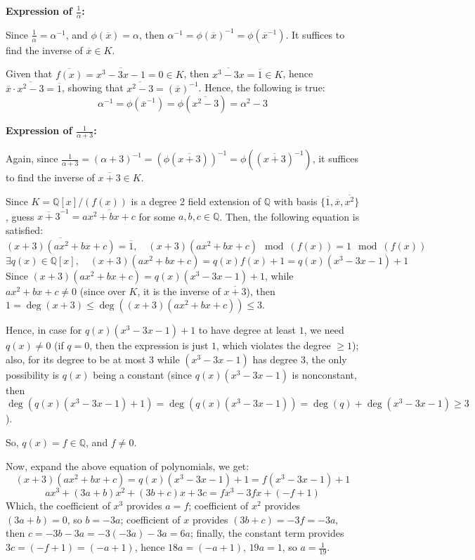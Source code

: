 \documentclass{article}
\begin{document}
\hfil

\textbf{Expression of $\frac{1}{\alpha}$:}

Since $\frac{1}{\alpha}=\alpha^{-1}$, and $\phi(\overline{x})=\alpha$, then $\alpha^{-1}=\phi(\overline{x})^{-1}=\phi(\overline{x}^{-1})$. It suffices to find the inverse of $\overline{x}\in K$.

Given that $\overline{f(x)}=\overline{x^3-3x-1}=0\in K$, then $\overline{x^3-3x}=\overline{1}\in K$, hence $\overline{x}\cdot\overline{x^2-3}=\overline{1}$, showing that $\overline{x^2-3}=(\overline{x})^{-1}$. 
Hence, the following is true:
$$\alpha^{-1}=\phi(\overline{x}^{-1})=\phi(\overline{x^2-3})=\alpha^2-3$$

\hfil

\textbf{Expression of $\frac{1}{\alpha+3}$:}

Again, since $\frac{1}{\alpha+3}=(\alpha+3)^{-1}=(\phi(\overline{x+3}))^{-1}=\phi((\overline{x+3})^{-1})$, it suffices to find the inverse of $\overline{x+3}\in K$.

Since $K=\mathbb{Q}[x]/(f(x))$ is a degree 2 field extension of $\mathbb{Q}$ with basis $\{\overline{1},\overline{x},\overline{x^2}\}$, guess $\overline{x+3}^{-1}=\overline{ax^2+bx+c}$ for some $a,b,c\in\mathbb{Q}$.
Then, the following equation is satisfied:
$$\overline{(x+3)(ax^2+bx+c)}=\overline{1},\quad (x+3)(ax^2+bx+c)\mod (f(x))=1\mod (f(x))$$
$$\exists q(x)\in\mathbb{Q}[x],\quad (x+3)(ax^2+bx+c) = q(x)f(x)+1 = q(x)(x^3-3x-1)+1$$ 
Since $(x+3)(ax^2+bx+c)=q(x)(x^3-3x-1)+1$, while $ax^2+bx+c\neq 0$ (since over $K$, it is the inverse of $\overline{x+3}$), then $1=\deg(x+3)\leq \deg((x+3)(ax^2+bx+c))\leq 3$.

Hence, in case for $q(x)(x^3-3x-1)+1$ to have degree at least $1$, we need $q(x)\neq 0$ (if $q=0$, then the expression is just $1$, which violates the degree $\geq 1$); 
also, for its degree to be at most $3$ while $(x^3-3x-1)$ has degree $3$, the only possibility is $q(x)$ being a constant (since $q(x)(x^3-3x-1)$ is nonconstant, then $\deg(q(x)(x^3-3x-1)+1)=\deg(q(x)(x^3-3x-1))=\deg(q)+ \deg(x^3-3x-1)\geq 3$).

So, $q(x)=f\in \mathbb{Q}$, and $f\neq 0$.

Now, expand the above equation of polynomials, we get:
$$(x+3)(ax^2+bx+c)=q(x)(x^3-3x-1)+1=f(x^3-3x-1)+1$$
$$ax^3+(3a+b)x^2+(3b+c)x+3c = fx^3-3fx+(-f+1)$$
Which, the coefficient of $x^3$ provides $a=f$; coefficient of $x^2$ provides $(3a+b)=0$, so $b=-3a$; coefficient of $x$ provides $(3b+c)=-3f=-3a$, then $c=-3b-3a = -3(-3a)-3a=6a$;
finally, the constant term provides $3c=(-f+1)=(-a+1)$, hence $18a=(-a+1)$, $19a=1$, so $a=\frac{1}{19}$.
\end{document}
